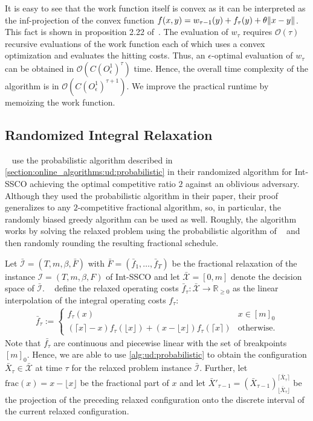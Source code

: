It is easy to see that the work function itself is convex as it can be interpreted as the inf-projection of the convex function $f(x,y) = w_{\tau-1}(y) + f_{\tau}(y) + \theta \lVert x - y\rVert$. This fact is shown in proposition 2.22 of~\cite{Burke2015}. The evaluation of $w_{\tau}$ requires $\mathcal{O}(\tau)$ recursive evaluations of the work function each of which uses a convex optimization and evaluates the hitting costs. Thus, an $\epsilon$-optimal evaluation of $w_{\tau}$ can be obtained in $\mathcal{O}(C (O_{\epsilon}^1)^{\tau})$ time. Hence, the overall time complexity of the algorithm is in $\mathcal{O}(C (O_{\epsilon}^1)^{\tau+1})$. We improve the practical runtime by memoizing the work function.

\subsection{Randomized Integral Relaxation}

\citeauthor*{Albers2018}~\cite{Albers2018} use the probabilistic algorithm described in \cref{section:online_algorithms:ud:probabilistic} in their randomized algorithm for Int-SSCO achieving the optimal competitive ratio $2$ against an oblivious adversary. Although they used the probabilistic algorithm in their paper, their proof generalizes to any $2$-competitive fractional algorithm, so, in particular, the randomly biased greedy algorithm can be used as well. Roughly, the algorithm works by solving the relaxed problem using the probabilistic algorithm of \citeauthor*{Bansal2015}~\cite{Bansal2015} and then randomly rounding the resulting fractional schedule.

Let $\bar{\mathcal{I}} = (T, m, \beta, \bar{F})$ with $\bar{F} = (\bar{f}_1, \dots, \bar{f}_T)$ be the fractional relaxation of the instance $\mathcal{I} = (T, m, \beta, F)$ of Int-SSCO and let $\bar{\mathcal{X}} = [0,m]$ denote the decision space of $\bar{\mathcal{I}}$. \citeauthor*{Albers2018}~\cite{Albers2018} define the relaxed operating costs $\bar{f}_{\tau} : \bar{\mathcal{X}} \to \mathbb{R}_{\geq 0}$ as the linear interpolation of the integral operating costs $f_{\tau}$: \begin{align*}
    \bar{f}_{\tau} := \begin{cases}
        f_{\tau}(x) & x \in [m]_0 \\
        (\lceil x \rceil - x) f_{\tau}(\lfloor x \rfloor) + (x - \lfloor x \rfloor) f_{\tau}(\lceil x \rceil) & \text{otherwise}.
    \end{cases}
\end{align*} Note that $\bar{f_{\tau}}$ are continuous and piecewise linear with the set of breakpoints $[m]_0$. Hence, we are able to use \cref{alg:ud:probabilistic} to obtain the configuration $\bar{X}_{\tau} \in \bar{\mathcal{X}}$ at time $\tau$ for the relaxed problem instance  $\bar{\mathcal{I}}$. Further, let $\text{frac}(x) = x - \lfloor x \rfloor$ be the fractional part of $x$ and let $\bar{X}'_{\tau-1} = (\bar{X}_{\tau-1})_{\lfloor\bar{X}_{\tau}\rfloor}^{\lceil\bar{X}_{\tau}\rceil}$ be the projection of the preceding relaxed configuration onto the discrete interval of the current relaxed configuration.

